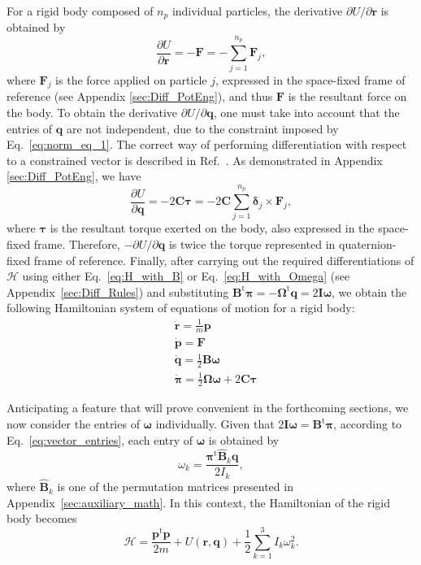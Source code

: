 \documentclass[aip,jcp,reprint,amsmath,amssymb]{revtex4-1}
\newcommand{\mt}[1]{\boldsymbol{\mathbf{#1}}}           %
\newcommand{\vt}[1]{\boldsymbol{\mathbf{#1}}}           %
\newcommand{\tr}[1]{#1^\text{t}}                        %
\newcommand{\diff}[2]{\dfrac{\partial #1}{\partial #2}} %
\begin{document}
For a rigid body composed of $n_p$ individual particles, the derivative $\partial U/\partial \vt r$ is obtained by
\[
\diff{U}{\vt r} = -\vt F = -\sum_{j=1}^{n_p} {\vt F_j},
\]
where $\vt F_j$ is the force applied on particle $j$, expressed in the space-fixed frame of reference (see Appendix \ref{sec:Diff_PotEng}), and thus $\vt F$ is the resultant force on the body. To obtain the derivative $\partial U/\partial \vt q$, one must take into account that the entries of $\vt q$ are not independent, due to the constraint imposed by Eq.~\ref{eq:norm_eq_1}. The correct way of performing differentiation with respect to a constrained vector is described in Ref.~. As demonstrated in Appendix \ref{sec:Diff_PotEng}, we have
\[
\diff{U}{\vt q} = -2 \mt C \vt \tau = -2 \mt C \sum_{j=1}^{n_p} {\vt \delta_j} \times {\vt F_j},
\]
where $\vt \tau$ is the resultant torque exerted on the body, also expressed in the space-fixed frame. Therefore, $-\partial U/\partial \vt q$ is twice the torque represented in quaternion-fixed frame of reference. Finally, after carrying out the required differentiations of $\mathcal{H}$ using either Eq.~\ref{eq:H_with_B} or Eq.~\ref{eq:H_with_Omega} (see Appendix~\ref{sec:Diff_Rules}) and substituting $\tr{\mt B} \vt \pi = - \tr{\mt \Omega} \vt q = 2 {\mt I} \vt \omega$, we obtain the following Hamiltonian system of equations of motion for a rigid body:
\begin{subequations}
\label{eq:EDO_system}
\begin{align}
&\dot{\vt r} = \frac{1}{m} \vt p \\
&\dot{\vt p} = \mt F \\
&\dot{\vt q} = \frac{1}{2} \mt B \vt \omega \\
&\dot{\vt \pi} = \frac{1}{2} \mt \Omega \vt \omega + 2 \mt C \vt \tau \label{eq:euler_eq_quat}
\end{align}
\end{subequations}

Anticipating a feature that will prove convenient in the forthcoming sections, we now consider the entries of $\vt \omega$ individually. Given that $2{\mt I}{\vt \omega} = \tr{\mt B}{\vt \pi}$, according to Eq.~\ref{eq:vector_entries}, each entry of $\vt \omega$ is obtained by
\begin{equation}
\label{eq:omega_entry}
\omega_k = \frac{\tr{\vt \pi} \hat{\mt B}_k \vt q}{2 I_k},
\end{equation}
where $\hat{\mt B}_k$ is one of the permutation matrices presented in Appendix~\ref{sec:auxiliary_math}. In this context, the Hamiltonian of the rigid body becomes
\begin{equation}
\label{eq:H_split_omega}
\mathcal{H} = \frac{\tr{\vt p} \vt p}{2m} + U(\vt r, \vt q) + \frac{1}{2} \sum_{k=1}^3 I_k \omega_k^2.
\end{equation}
\end{document}
